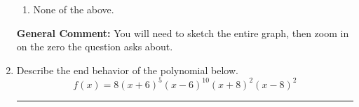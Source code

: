 \documentclass{extbook}[14pt]
\newcommand{\litem}[1]{\item #1

\rule{\textwidth}{0.4pt}}
\begin{document}
\begin{enumerate}
{\begin{enumerate}[label=\Alph*.]
\item None of the above.\end{enumerate}
\textbf{General Comment:} You will need to sketch the entire graph, then zoom in on the zero the question asks about.
}
\litem{
Describe the end behavior of the polynomial below.
\[ f(x) = 8(x + 6)^{5}(x - 6)^{10}(x + 8)^{2}(x - 8)^{2} \]

}
\end{enumerate}
\end{document}
